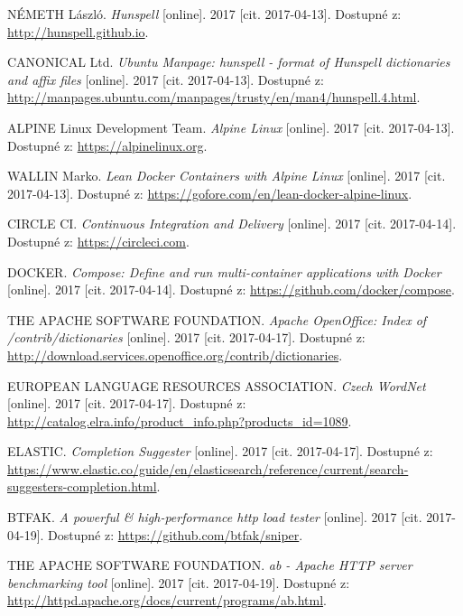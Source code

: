 \documentclass[FM,DP]{tulthesis}
\begin{document}
\begin{thebibliography}{Mm99}
 NÉMETH László. \emph{Hunspell} [online].
2017 [cit. 2017-04-13]. Dostupné z: \url{http://hunspell.github.io}.

 CANONICAL Ltd. 
\emph{Ubuntu Manpage: hunspell - format of Hunspell dictionaries and affix files} [online].
2017 [cit. 2017-04-13]. Dostupné z: \url{http://manpages.ubuntu.com/manpages/trusty/en/man4/hunspell.4.html}.

 ALPINE Linux Development Team. \emph{Alpine Linux} [online].
2017 [cit. 2017-04-13]. Dostupné z: \url{https://alpinelinux.org}.

 WALLIN Marko. \emph{Lean Docker Containers with Alpine Linux} [online].
2017 [cit. 2017-04-13]. Dostupné z: \url{https://gofore.com/en/lean-docker-alpine-linux}.

 CIRCLE CI. \emph{Continuous Integration and Delivery} [online].
2017 [cit. 2017-04-14]. Dostupné z: \url{https://circleci.com}.

 DOCKER. \emph{Compose: Define and run multi-container applications with Docker} [online].
2017 [cit. 2017-04-14]. Dostupné z: \url{https://github.com/docker/compose}.

 THE APACHE SOFTWARE FOUNDATION. \emph{Apache OpenOffice: Index of /contrib/dictionaries}
[online]. 2017 [cit. 2017-04-17]. Dostupné z: \url{http://download.services.openoffice.org/contrib/dictionaries}.

 EUROPEAN LANGUAGE RESOURCES ASSOCIATION. \emph{Czech WordNet} [online].
2017 [cit. 2017-04-17]. Dostupné z: \url{http://catalog.elra.info/product_info.php?products_id=1089}.

 ELASTIC. \emph{Completion Suggester} [online].
2017 [cit. 2017-04-17]. Dostupné z: 
\url{https://www.elastic.co/guide/en/elasticsearch/reference/current/search-suggesters-completion.html}.

 BTFAK. \emph{A powerful \& high-performance http load tester} [online].
2017 [cit. 2017-04-19]. Dostupné z: \url{https://github.com/btfak/sniper}.

 THE APACHE SOFTWARE FOUNDATION. \emph{ab - Apache HTTP server benchmarking tool} [online].
2017 [cit. 2017-04-19]. Dostupné z: \url{http://httpd.apache.org/docs/current/programs/ab.html}.

\end{thebibliography}


\end{document}
